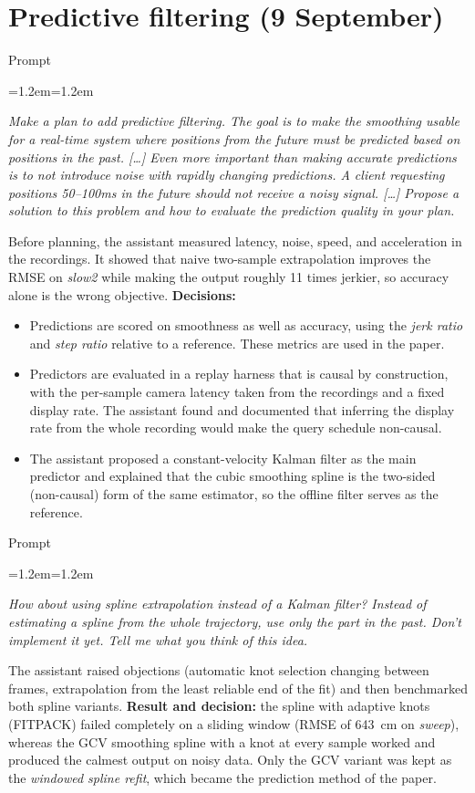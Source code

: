 \documentclass[11pt,a4paper]{article}
\newenvironment{prompt}[1]
  {\par\smallskip\noindent\textsf{\small #1}\par\nopagebreak
   \begin{list}{}{\leftmargin=1.2em\rightmargin=1.2em}\item\itshape\small}
  {\end{list}\smallskip}
\begin{document}
\section{Predictive filtering (9 September)}

\begin{prompt}{Prompt}
Make a plan to add predictive filtering. The goal is to make the smoothing usable for a real-time system where positions from the future must be predicted based on positions in the past. [\dots] Even more important than making accurate predictions is to not introduce noise with rapidly changing predictions. A client requesting positions 50--100ms in the future should not receive a noisy signal. [\dots] Propose a solution to this problem and how to evaluate the prediction quality in your plan.
\end{prompt}

Before planning, the assistant measured latency, noise, speed, and acceleration in the recordings.
It showed that naive two-sample extrapolation improves the RMSE on \emph{slow2} while making the output roughly 11 times jerkier, so accuracy alone is the wrong objective.
\textbf{Decisions:}
\begin{itemize}
  \item Predictions are scored on smoothness as well as accuracy, using the \emph{jerk ratio} and \emph{step ratio} relative to a reference.
    These metrics are used in the paper.
  \item Predictors are evaluated in a replay harness that is causal by construction, with the per-sample camera latency taken from the recordings and a fixed display rate.
    The assistant found and documented that inferring the display rate from the whole recording would make the query schedule non-causal.
  \item The assistant proposed a constant-velocity Kalman filter as the main predictor and explained that the cubic smoothing spline is the two-sided (non-causal) form of the same estimator, so the offline filter serves as the reference.
\end{itemize}

\begin{prompt}{Prompt}
How about using spline extrapolation instead of a Kalman filter? Instead of estimating a spline from the whole trajectory, use only the part in the past. Don't implement it yet. Tell me what you think of this idea.
\end{prompt}

The assistant raised objections (automatic knot selection changing between frames, extrapolation from the least reliable end of the fit) and then benchmarked both spline variants.
\textbf{Result and decision:} the spline with adaptive knots (FITPACK) failed completely on a sliding window (RMSE of 643~cm on \emph{sweep}), whereas the GCV smoothing spline with a knot at every sample worked and produced the calmest output on noisy data.
Only the GCV variant was kept as the \emph{windowed spline refit}, which became the prediction method of the paper.
\end{document}
